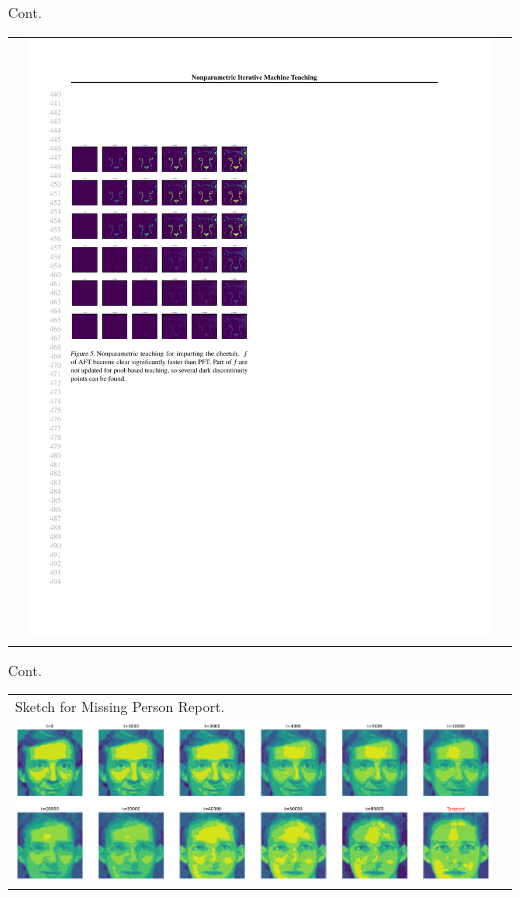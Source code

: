 \documentclass[aspectratio=169,xcolor=dvipsnames]{beamer}
\begin{document}
\begin{frame}{Cont.}
\begin{tabular}{ccc}
&
\includegraphics[scale=0.78]{./out/realworld/cheetah}
\end{tabular}

\end{frame}


\begin{frame}{Cont.}
\begin{tabular}{lc}
{\scriptsize \color{blue} Sketch for Missing Person Report.}\vspace{-.8mm}\\

\includegraphics[width=\linewidth]{./out/realworld/2d face eta=0.05 B=one}

\end{tabular}
\end{frame}
\end{document}
